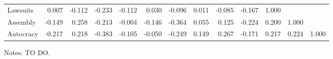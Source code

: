 \begin{table}[h]
{\begin{threeparttable}
\begin{tabular}{lrrrrrrrrrrrr}
Lawsuits & 0.007 & -0.112 & -0.233 & -0.112 & 0.030 & -0.096 & 0.011 & -0.085 & -0.167 & 1.000 &  &  \\
Assembly & -0.149 & 0.258 & -0.213 & -0.004 & -0.146 & -0.364 & 0.055 & 0.125 & -0.224 & 0.200 & 1.000 &  \\
Autocracy & -0.217 & 0.218 & -0.383 & -0.105 & -0.050 & -0.249 & 0.149 & 0.267 & -0.171 & 0.217 & 0.224 & 1.000  \\
\hline \hline
\end{tabular}
		\begin{tablenotes}
			\footnotesize{Notes: TO DO.}
		\end{tablenotes}
	\end{threeparttable}
}
\end{table}
